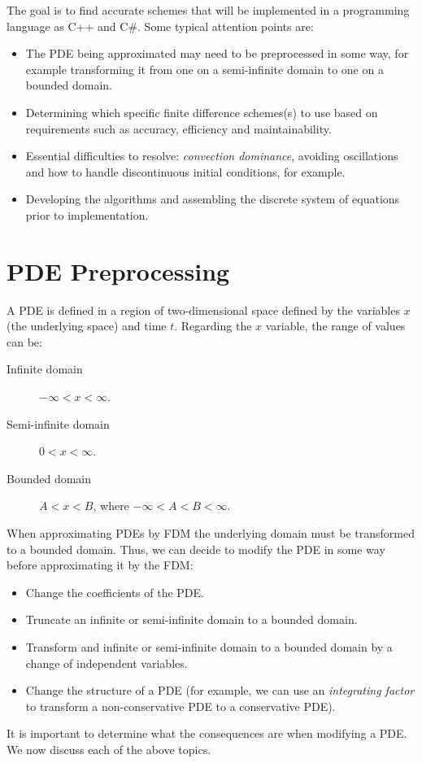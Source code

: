 \begin{frame}[t]{\subsecname}
The goal is to find accurate schemes that will be implemented in a programming language as C++ and C\#. Some typical attention points are:
\begin{itemize}
	\item The PDE being approximated may need to be preprocessed in some way, for example transforming it from one on a semi-infinite domain to one on a bounded domain.
	\item Determining which specific finite difference schemes(s) to use based on requirements such as accuracy, efficiency and maintainability.
	\item Essential difficulties to resolve: \emph{convection dominance}, avoiding oscillations and how to handle discontinuous initial conditions, for example.
	\item Developing the algorithms and assembling the discrete system of equations prior to implementation.
\end{itemize}
\end{frame}

\section{PDE Preprocessing}
\begin{frame}[t]{\secname}
A PDE is defined in a region of two-dimensional space defined by the variables $x$ (the underlying space) and time $t$. Regarding the $x$ variable, the range of values can be:
\begin{description}
	\item[Infinite domain] $-\infty<x<\infty$.
	\item[Semi-infinite domain] $0<x<\infty$.
	\item[Bounded domain] $A<x<B$, where $-\infty<A<B<\infty$.
\end{description}
When approximating PDEs by FDM the underlying domain must be transformed to a bounded domain. Thus, we can decide to modify the PDE in some way before approximating it by the FDM:
\begin{itemize}
	\item Change the coefficients of the PDE.
	\item Truncate an infinite or semi-infinite domain to a bounded domain.
	\item Transform and infinite or semi-infinite domain to a bounded domain by a change of independent variables.
	\item Change the structure of a PDE (for example, we can use an \emph{integrating factor} to transform a non-conservative PDE to a conservative PDE).
\end{itemize}
It is important to determine what the consequences are when modifying a PDE. We now discuss each of the above topics.
\end{frame}

